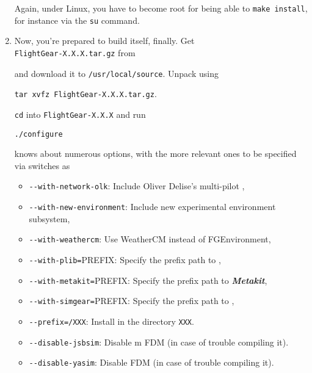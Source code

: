 \begin{enumerate}
 \noindent
 Again, under Linux, you have to become root for being able to \texttt{make
install}, for instance via the \texttt{su} command.

\item Now, you're prepared to build \FlightGear{} itself, finally.
 Get\\ \texttt{FlightGear-X.X.X.tar.gz} from
  \medskip

   \medskip

 \noindent
and download it to \texttt{/usr/local/source}. Unpack \FlightGear{} using
 \medskip

        \texttt{tar xvfz FlightGear-X.X.X.tar.gz}.
 \medskip

\texttt{cd} into \texttt{FlightGear-X.X.X} and run

        \texttt{./configure}
 \medskip

 knows about numerous options,  with the more
relevant ones to be specified via switches as

\begin{itemize}
\item{\texttt{-$ $-with-network-olk}}:      Include Oliver Delise's multi-pilot ,

\item{\texttt{-$ $-with-new-environment}}:    Include new experimental environment subsystem,

\item{\texttt{-$ $-with-weathercm}}:    Use WeatherCM instead of FGEnvironment,

\item{\texttt{-$ $-with-plib=}PREFIX}:  Specify the prefix path to \PLIB{},

\item{\texttt{-$ $-with-metakit=}PREFIX}:  Specify the prefix path to \textbf{\textit{Metakit}},

\item{\texttt{-$ $-with-simgear=}PREFIX}:  Specify the prefix path to \SimGear{},

\item{\texttt{-$ $-prefix=/XXX}}: Install \FlightGear{} in the directory \texttt{XXX}.

\item{\texttt{-$ $-disable-jsbsim}}: Disable \JSBSim{}m FDM (in case of trouble compiling it).

\item{\texttt{-$ $-disable-yasim}}: Disable \YASim{} FDM (in case of trouble compiling it).


\end{itemize}
\end{enumerate}
